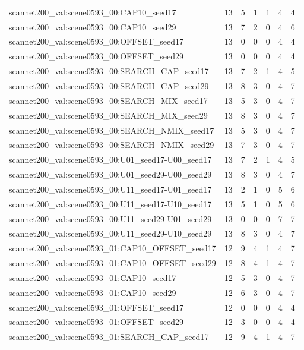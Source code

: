 \begin{table}[t]
\begin{tabular}{lrrrrrr}
scannet200\_val:scene0593\_00:CAP10\_seed17 & 13 & 5 & 1 & 1 & 4 & 4 \\
scannet200\_val:scene0593\_00:CAP10\_seed29 & 13 & 7 & 2 & 0 & 4 & 6 \\
scannet200\_val:scene0593\_00:OFFSET\_seed17 & 13 & 0 & 0 & 0 & 4 & 4 \\
scannet200\_val:scene0593\_00:OFFSET\_seed29 & 13 & 0 & 0 & 0 & 4 & 4 \\
scannet200\_val:scene0593\_00:SEARCH\_CAP\_seed17 & 13 & 7 & 2 & 1 & 4 & 5 \\
scannet200\_val:scene0593\_00:SEARCH\_CAP\_seed29 & 13 & 8 & 3 & 0 & 4 & 7 \\
scannet200\_val:scene0593\_00:SEARCH\_MIX\_seed17 & 13 & 5 & 3 & 0 & 4 & 7 \\
scannet200\_val:scene0593\_00:SEARCH\_MIX\_seed29 & 13 & 8 & 3 & 0 & 4 & 7 \\
scannet200\_val:scene0593\_00:SEARCH\_NMIX\_seed17 & 13 & 5 & 3 & 0 & 4 & 7 \\
scannet200\_val:scene0593\_00:SEARCH\_NMIX\_seed29 & 13 & 7 & 3 & 0 & 4 & 7 \\
scannet200\_val:scene0593\_00:U01\_seed17-U00\_seed17 & 13 & 7 & 2 & 1 & 4 & 5 \\
scannet200\_val:scene0593\_00:U01\_seed29-U00\_seed29 & 13 & 8 & 3 & 0 & 4 & 7 \\
scannet200\_val:scene0593\_00:U11\_seed17-U01\_seed17 & 13 & 2 & 1 & 0 & 5 & 6 \\
scannet200\_val:scene0593\_00:U11\_seed17-U10\_seed17 & 13 & 5 & 1 & 0 & 5 & 6 \\
scannet200\_val:scene0593\_00:U11\_seed29-U01\_seed29 & 13 & 0 & 0 & 0 & 7 & 7 \\
scannet200\_val:scene0593\_00:U11\_seed29-U10\_seed29 & 13 & 8 & 3 & 0 & 4 & 7 \\
scannet200\_val:scene0593\_01:CAP10\_OFFSET\_seed17 & 12 & 9 & 4 & 1 & 4 & 7 \\
scannet200\_val:scene0593\_01:CAP10\_OFFSET\_seed29 & 12 & 8 & 4 & 1 & 4 & 7 \\
scannet200\_val:scene0593\_01:CAP10\_seed17 & 12 & 5 & 3 & 0 & 4 & 7 \\
scannet200\_val:scene0593\_01:CAP10\_seed29 & 12 & 6 & 3 & 0 & 4 & 7 \\
scannet200\_val:scene0593\_01:OFFSET\_seed17 & 12 & 0 & 0 & 0 & 4 & 4 \\
scannet200\_val:scene0593\_01:OFFSET\_seed29 & 12 & 3 & 0 & 0 & 4 & 4 \\
scannet200\_val:scene0593\_01:SEARCH\_CAP\_seed17 & 12 & 9 & 4 & 1 & 4 & 7 \\

\end{tabular}
\end{table}
